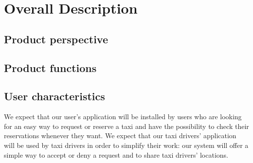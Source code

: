 \documentclass{article}
\begin{document}
\newpage
\section{Overall Description}
	\subsection{Product perspective}
	
	\subsection{Product functions}
	
	\subsection{User characteristics}
	
	We expect that our user's application will be installed by users who are looking for an easy way to request or reserve a taxi and have the possibility to check their reservations whenever they want.
	We expect that our taxi drivers' application will be used by taxi drivers in order to simplify their work: our system will offer a simple way to accept or deny a request and to share taxi drivers' locations.
	
\end{document}
